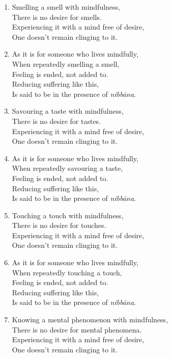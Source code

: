\documentclass[10pt, openany]{book}
\begin{document}
\begin{enumerate}
\item Smelling a smell with mindfulness,\\
There is no desire for smells.\\
Experiencing it with a mind free of desire,\\
One doesn’t remain clinging to it.

\item As it is for someone who lives mindfully,\\
When repeatedly smelling a smell,\\
Feeling is ended, not added to.\\
Reducing suffering like this,\\
Is said to be in the presence of \emph{nibbāna}.

\item Savouring a taste with mindfulness,\\
There is no desire for tastes.\\
Experiencing it with a mind free of desire,\\
One doesn’t remain clinging to it.

\item As it is for someone who lives mindfully,\\
When repeatedly savouring a taste,\\
Feeling is ended, not added to.\\
Reducing suffering like this,\\
Is said to be in the presence of \emph{nibbāna}.

\item Touching a touch with mindfulness,\\
There is no desire for touches.\\
Experiencing it with a mind free of desire,\\
One doesn’t remain clinging to it.

\item As it is for someone who lives mindfully,\\
When repeatedly touching a touch,\\
Feeling is ended, not added to.\\
Reducing suffering like this,\\
Is said to be in the presence of \emph{nibbāna}.

\item Knowing a mental phenomenon with mindfulness,\\
There is no desire for mental phenomena.\\
Experiencing it with a mind free of desire,\\
One doesn’t remain clinging to it.


\end{enumerate}
\end{document}

